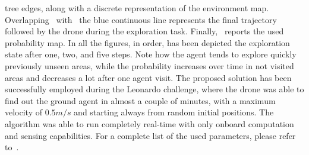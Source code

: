 tree edges, along with a discrete representation of the environment map. Overlapping~ with~
the blue continuous line represents the final trajectory followed by the drone during the exploration task. Finally,~
reports the used probability map. In all the figures, in order, has been depicted the exploration state after one, two, and five steps.
Note how the agent tends to explore quickly previously unseen areas, while the probability increases over time in not visited areas and
decreases a lot after one agent visit. The proposed solution has been successfully employed during the Leonardo challenge, where
the drone was able to find out the ground agent in almost a couple of minutes, with a maximum velocity of $0.5m/s$ and starting always
from random initial positions. The algorithm was able to run completely real-time with only onboard computation and sensing capabilities.
For a complete list of the used parameters, please refer to~.

